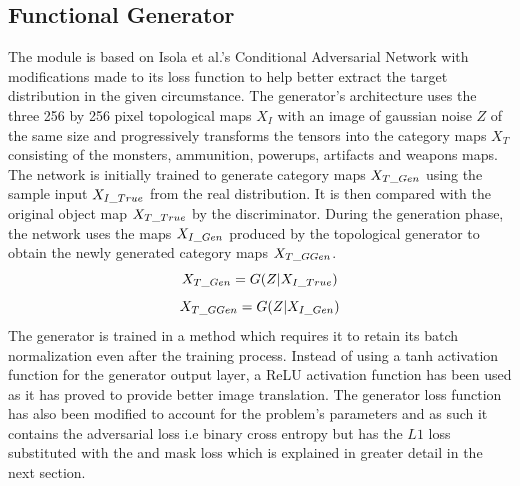 \documentclass{Configuration_Files/PoliMi3i_thesis}
\begin{document}
\subsection{Functional Generator}
The module is based on Isola et al.’s Conditional Adversarial Network with 
modifications made to its loss function to help better extract the target distribution in 
the given circumstance. The generator’s architecture uses the three 256 by 256 pixel 
topological maps $X_{I}$ with an image of gaussian noise $Z$ of the same size and 
progressively transforms the tensors into the category maps $X_{T}$ consisting of the 
monsters, ammunition, powerups, artifacts and weapons maps. The network is 
initially trained to generate category maps $X_{T\char`_Gen}$ using the sample input $X_{I\char`_True}$ 
from the real distribution. It is then compared with the original object map $X_{T\char`_True}$ by 
the discriminator. During the generation phase, the network uses the maps $X_{I\char`_Gen}$ 
produced by the topological generator to obtain the newly generated category maps 
$X_{T\char`_GGen}$.
\begin{equation} \label{eq:ctgen}
X_{T\char`_Gen} = G(Z|X_{I\char`_True}) 
\end{equation}
\begin{equation} \label{eq:cggen}
X_{T\char`_GGen} = G(Z|X_{I\char`_Gen})
\end{equation}
The generator is trained in a method which requires it to retain its batch 
normalization even after the training process. Instead of using a tanh activation 
function for the generator output layer, a ReLU activation function 
has been used as it has proved to provide better image translation. The generator loss 
function has also been modified to account for the problem's parameters and as such 
it contains the adversarial loss i.e binary cross entropy but has the $L1$ loss substituted 
with the and mask loss which is explained in greater detail in the next section.
\end{document}
